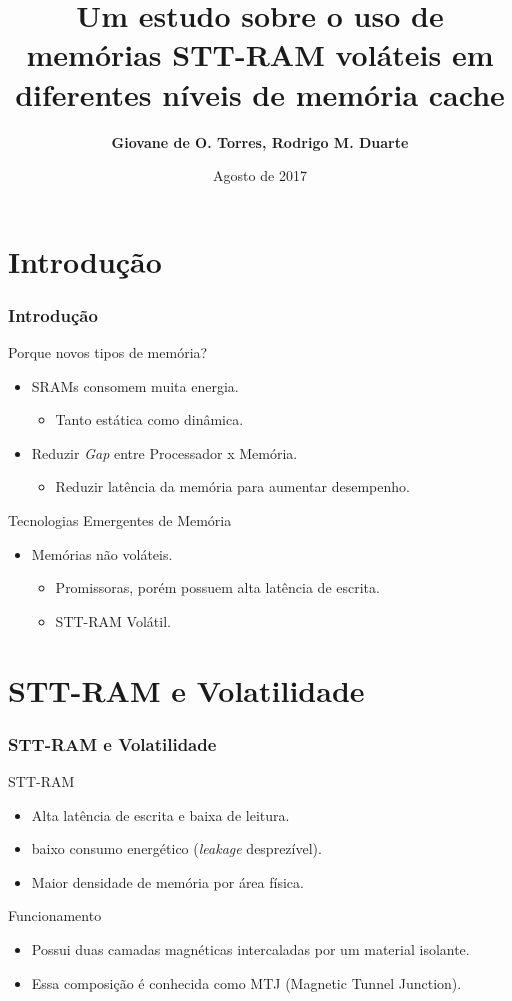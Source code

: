 \documentclass[10pt, pdf,xcolor=pdftex,dvipsnames,table]{beamer}
\title{Um estudo sobre o uso de memórias STT-RAM voláteis em diferentes níveis de memória cache}
\author[]{\textbf{Giovane de O. Torres\inst{1}, Rodrigo M. Duarte\inst{1}}\\
}
\institute{Pós-Graduação em Computação \\ Universidade Federal de Pelotas \\
\url{} 
}
\date{Agosto de 2017}
\begin{document}
\frame{\titlepage}
\frame{\tableofcontents}


\section{Introdução}

\frame
{
\frametitle{Introdução}
		\begin{block}{Porque novos tipos de memória?}
			\begin{itemize}
				\item SRAMs consomem muita energia.
				\begin{itemize}
					\item Tanto estática como dinâmica.
				\end{itemize}
				\item Reduzir \textit{Gap} entre Processador x Memória.
				\begin{itemize}
					\item Reduzir latência da memória para aumentar desempenho.
				\end{itemize}
			\end{itemize}	 
		\end{block}
		\begin{block}{Tecnologias Emergentes de Memória}
			\begin{itemize}
				\item Memórias não voláteis.
				\begin{itemize}
					\item Promissoras, porém possuem alta latência de escrita.
					\item STT-RAM Volátil.
				\end{itemize}
			\end{itemize}	 
		\end{block}
}

\section{STT-RAM e Volatilidade}

\frame
{
\frametitle{STT-RAM e Volatilidade}
		\begin{block}{STT-RAM}
			\begin{itemize}
				\item Alta latência de escrita e baixa de leitura.
				\item baixo consumo energético (\textit{leakage} desprezível).
				\item Maior densidade de memória por área física.
			\end{itemize}	 
		\end{block}
		\begin{block}{Funcionamento}
			\begin{itemize}
				\item Possui duas camadas magnéticas intercaladas por um material isolante.
				\item Essa composição é conhecida como MTJ (Magnetic Tunnel Junction).
			\end{itemize}	 
		\end{block}
}
\end{document}
